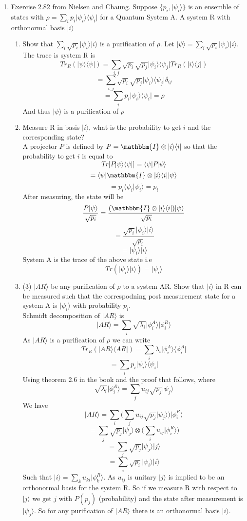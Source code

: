 \documentclass[12pt]{article}
\newcommand{\ket}[1]{\vert{#1}\rangle}
\newcommand{\bra}[1]{\langle{#1}\vert}
\begin{document}
\begin{enumerate}
\item Exercise 2.82 from Nielsen and Chaung. Suppose $\{ p_i, \ket{\psi_i}\}$ is an ensemble of states with $\rho = \sum_i p_i \ket{\psi_i}\bra{\psi_i}$ for a Quantum System A. A system R with orthonormal basis $\ket{i}$ 
\begin{enumerate}
    \item Show that $\sum_i \sqrt{p_i} \ket{\psi_i}\ket{i}$ is a purification of $\rho$. Let $\ket{\psi} = \sum_i \sqrt{p_i} \ket{\psi_i}\ket{i}$. The trace is system R is 
    $$ Tr_R ( \ket{\psi} \bra{\psi}) = \sum_{i,j} \sqrt{p_i} \sqrt{p_j} \ket{\psi_i}\bra{\psi_j} Tr_R (\ket{i}\bra{j}) $$
    $$ = \sum_{i,j} \sqrt{p_i} \sqrt{p_j} \ket{\psi_i }\bra{\psi_j} \delta_{ij} $$
    $$ = \sum_i p_i \ket{\psi_i} \bra{\psi_i} = \rho $$
    And thus $\ket{\psi}$ is a purification of $\rho$ 
    \item Measure R in basis $\ket{i}$, what is the probability to get $i$ and the corresponding state? 
    \\
    A projector $P$ is defined by $P = \mathbbm{I} \otimes \ket{i}\bra{i}$ so that the probability to get $i$ is equal to 
    $$ Tr \Big[ P \ket{\psi} \bra{\psi}\Big] = \langle \psi | P | \psi \rangle $$
    $$ = \langle \psi | \mathbbm{I} \otimes \ket{i}\bra{i} | \psi \rangle $$
    $$ = p_i \langle \psi_i | \psi_i \rangle = p_i $$
    After measuring, the state will be 
    $$ \frac{P \ket{\psi}}{\sqrt{p_i}} = \frac{(\mathbbm{I} \otimes \ket{i}\bra{i})\ket{\psi}}{\sqrt{p_i}} $$
    $$ = \frac{\sqrt{p_i}\ket{\psi_i}\ket{i}}{\sqrt{p_i}} $$
    $$ = \ket{\psi_i} \ket{i} $$ 
    System A is the trace of the above state i.e 
    $$ Tr(\ket{\psi_i}\ket{i}) = \ket{\psi_i} $$ 
    \item (3) $\ket{AR}$ be any purification of $\rho$ to a system AR. Show that $\ket{i}$ in R can be measured such that the correspodning post measurement state for a system A is $\ket{\psi_i}$ with probability $p_i$. 
    \\
    Schmidt decomposition of $\ket{AR}$ is 
    $$ \ket{AR} = \sum_i \sqrt{\lambda_i} \ket{\phi_i^A} \ket{\phi_i^R} $$
    As $\ket{AR}$ is a purification of $\rho$ we can write 
    $$ Tr_R ( \ket{AR}\bra{AR}) = \sum_i \lambda_i \ket{\phi_i^A}\bra{\phi_i^A} $$
    $$ = \sum_i p_i \ket{\psi_i}\bra{\psi_i} $$
    Using theorem 2.6 in the book and the proof that follows, where 
    $$ \sqrt{\lambda_i} \ket{\phi_i^A} = \sum_j u_{ij} \sqrt{p_j} \ket{\psi_j} $$ 
    We have 
    $$ \ket{AR} = \sum_i \Big( \sum_j u_{ij} \sqrt{p_j}\ket{\psi_j}\Big) \ket{\phi_i^R} $$
    $$ = \sum_j \sqrt{p_j} \ket{\psi_j} \otimes \Big( \sum_i u_{ij} \ket{\phi_i^R} \Big) $$
    $$ = \sum_j \sqrt{p_j} \ket{\psi_j} \ket{j} $$
    $$ = \sum_i \sqrt{p_i} \ket{\psi_i} \ket{i} $$ 
    Such that $\ket{i} = \sum_k u_{ki} \ket{\phi_k^R}$. As $u_{ij}$ is unitary $\ket{j}$ is implied to be an orthonormal basis for the system R. So if we measure R with respect to $\ket{j}$ we get $j$ with $P(p_j)$ (probability) and the state after measurement is $\ket{\psi_j}$. So for any purification of $\ket{AR}$ there is an orthonormal basis $\ket{i}$. 
\end{enumerate}



\end{enumerate}
\end{document}
